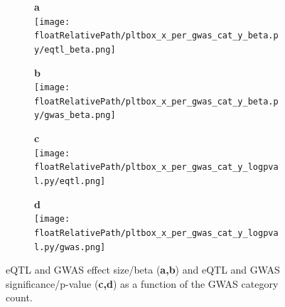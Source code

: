 \begin{figure}[!]
\centering
%
\begin{subfigure}[]{.33\textwidth}
\textbf{a}
\\
\texttt{[image: \\floatRelativePath/pltbox\_x\_per\_gwas\_cat\_y\_beta.py/eqtl\_beta.png]}
\end{subfigure}
%
\begin{subfigure}[]{.33\textwidth}
\textbf{b}
\\
\texttt{[image: \\floatRelativePath/pltbox\_x\_per\_gwas\_cat\_y\_beta.py/gwas\_beta.png]}
\end{subfigure}

\begin{subfigure}[]{.33\textwidth}
\textbf{c}
\\
\texttt{[image: \\floatRelativePath/pltbox\_x\_per\_gwas\_cat\_y\_logpval.py/eqtl.png]}
\end{subfigure}
%
\begin{subfigure}[]{.33\textwidth}
\textbf{d}
\\
\texttt{[image: \\floatRelativePath/pltbox\_x\_per\_gwas\_cat\_y\_logpval.py/gwas.png]}
\end{subfigure}

\caption{eQTL and GWAS effect size/beta (\textbf{a,b}) and eQTL and GWAS significance/p-value (\textbf{c,d}) as a function of the GWAS category count.} \label{fig:beta_pval}
%
\end{figure}

%
%

